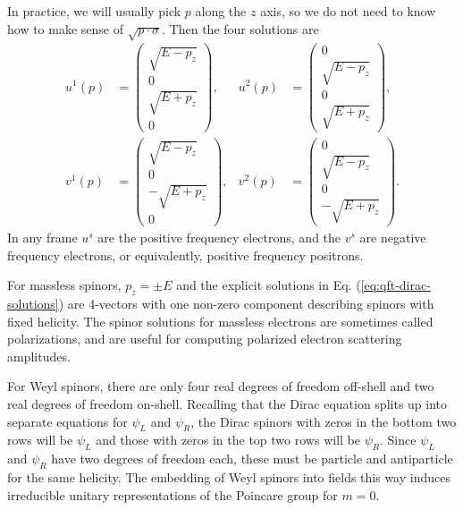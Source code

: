 In practice, we will usually pick $p$ along the $z$ axis, so we do not need to know how to make sense of $\sqrt{p \cdot \sigma}$. Then the four solutions are
\begin{equation}\label{eq:qft-dirac-solutions}
\begin{aligned}
	u^{1}(p) &= \left(\begin{array}{c}
		\sqrt{E-p_{z}} \\ 0 \\
		\sqrt{E+p_{z}} \\ 0
	\end{array}\right), & 
	u^{2}(p) &= \left(\begin{array}{c}
		0 \\ \sqrt{E-p_{z}} \\
		0 \\ \sqrt{E+p_{z}}
	\end{array}\right), \\
	v^{1}(p) &= \left(\begin{array}{c}
		\sqrt{E-p_{z}} \\ 0 \\
		-\sqrt{E+p_{z}} \\ 0
	\end{array}\right), & 
	v^{2}(p) &= \left(\begin{array}{c}
		0 \\ \sqrt{E-p_{z}} \\
		0 \\ -\sqrt{E+p_{z}}
	\end{array}\right).
\end{aligned}
\end{equation}
In any frame $u^{s}$ are the positive frequency electrons, and the $v^{s}$ are negative frequency electrons, or equivalently, positive frequency positrons.

For massless spinors, $p_{z}=\pm E$ and the explicit solutions in Eq. (\ref{eq:qft-dirac-solutions}) are 4-vectors with one non-zero component describing spinors with fixed helicity. 
The spinor solutions for massless electrons are sometimes called polarizations, and are useful for computing polarized electron scattering amplitudes.

For Weyl spinors, there are only four real degrees of freedom off-shell and two real degrees of freedom on-shell. 
Recalling that the Dirac equation splits up into separate equations for $\psi_{L}$ and $\psi_{R}$, the Dirac spinors with zeros in the bottom two rows will be $\psi_{L}$ and those with zeros in the top two rows will be $\psi_{R}$. 
Since $\psi_{L}$ and $\psi_{R}$ have two degrees of freedom each, these must be particle and antiparticle for the same helicity. 
The embedding of Weyl spinors into fields this way induces irreducible unitary representations of the Poincare group for $m=0$.

